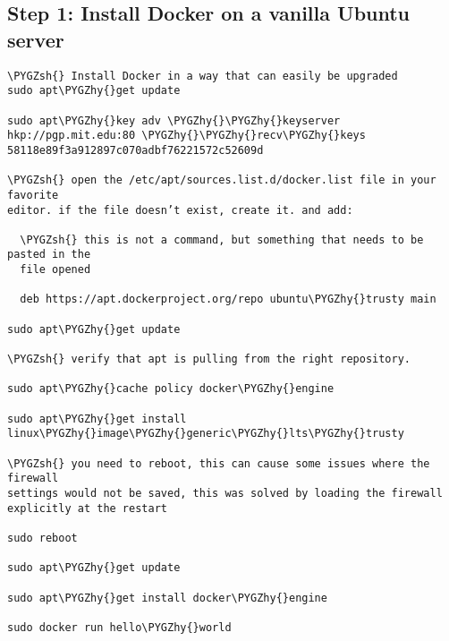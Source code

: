 \documentclass[letterpaper,10pt,english]{sphinxmanual}
\def\PYGZsh{\char`\#}
\def\PYGZhy{\char`\-}
\begin{document}
\subsection{Step 1: Install Docker on a vanilla Ubuntu server}
\label{admin:step-1-install-docker-on-a-vanilla-ubuntu-server}
\begin{Verbatim}[commandchars=\\\{\}]
\PYGZsh{} Install Docker in a way that can easily be upgraded
sudo apt\PYGZhy{}get update

sudo apt\PYGZhy{}key adv \PYGZhy{}\PYGZhy{}keyserver hkp://pgp.mit.edu:80 \PYGZhy{}\PYGZhy{}recv\PYGZhy{}keys
58118e89f3a912897c070adbf76221572c52609d

\PYGZsh{} open the /etc/apt/sources.list.d/docker.list file in your favorite
editor. if the file doesn’t exist, create it. and add:

  \PYGZsh{} this is not a command, but something that needs to be pasted in the
  file opened

  deb https://apt.dockerproject.org/repo ubuntu\PYGZhy{}trusty main

sudo apt\PYGZhy{}get update

\PYGZsh{} verify that apt is pulling from the right repository.

sudo apt\PYGZhy{}cache policy docker\PYGZhy{}engine

sudo apt\PYGZhy{}get install linux\PYGZhy{}image\PYGZhy{}generic\PYGZhy{}lts\PYGZhy{}trusty

\PYGZsh{} you need to reboot, this can cause some issues where the firewall
settings would not be saved, this was solved by loading the firewall
explicitly at the restart

sudo reboot

sudo apt\PYGZhy{}get update

sudo apt\PYGZhy{}get install docker\PYGZhy{}engine

sudo docker run hello\PYGZhy{}world
\end{Verbatim}
\end{document}
